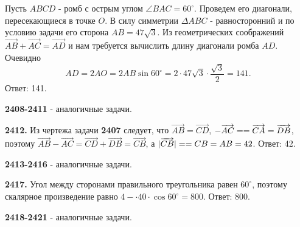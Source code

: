 Пусть $ABCD$ - ромб с острым углом $\angle BAC = 60^\circ$. Проведем его диагонали, пересекающиеся в точке $O$. В силу симметрии $\Delta ABC$ - равносторонний и по условию задачи его сторона $AB=47\sqrt{3}$. Из геометрических соображений $\overrightarrow{AB}+\overrightarrow{AC}=\overrightarrow{AD}$
и нам требуется вычислить длину диагонали ромба $AD$. Очевидно
\[
AD=2AO=2AB\sin{60^\circ}=2\cdot47\sqrt{3}\cdot\frac{\sqrt{3}}{2}=141.
\]  \newline \null \hspace*{\fill} Ответ: 141. 

\textbf{2408-2411} - аналогичные задачи.

\textbf{2412.} Из чертежа задачи \textbf{2407} следует, что $\overrightarrow{AB}=\overrightarrow{CD}$, $-\overrightarrow{AC}=\linebreak=\overrightarrow{CA} = \overrightarrow{DB}$, поэтому $\overrightarrow{AB}-\overrightarrow{AC}=\overrightarrow{CD}+\overrightarrow{DB}=\overrightarrow{CB}$, а $|\overrightarrow{CB}|=\linebreak=CB=AB=42$. \newline \null \hspace*{\fill} Ответ: 42.
 
\textbf{2413-2416} - аналогичные задачи.

\textbf{2417.}  Угол между сторонами правильного треугольника равен $60^\circ$, поэтому скалярное произведение равно $4-\cdot40\cdot\cos{60^\circ}=800$. \newline \null \hspace*{\fill} Ответ: 800.

\textbf{2418-2421} - аналогичные задачи.
